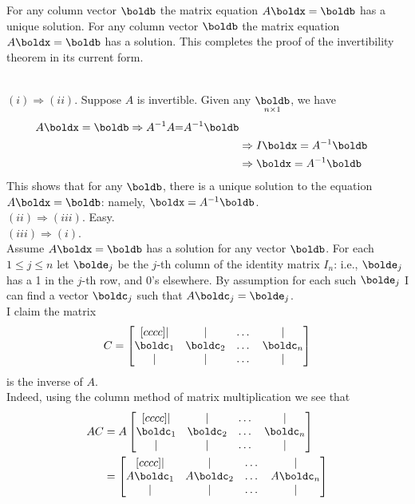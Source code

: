 \ii For any column vector $\boldb$ the matrix equation $A\boldx=\boldb$ has a unique solution.
\ii For any column vector $\boldb$ the matrix equation $A\boldx=\boldb$ has a solution.
\ee
This completes the proof of the invertibility theorem in its current form.
\\
\begin{solution}
\ \\
$(i)\Rightarrow (ii)$. Suppose $A$ is invertible. Given any $\underset{n\times 1}{\boldb}$, we have
\begin{align*}
A\boldx=\boldb\Rightarrow A^{-1}A\bold=A^{-1}\boldb\\
&\Rightarrow I\boldx=A^{-1}\boldb\\
&\Rightarrow \boldx=A^{-1}\boldb
\end{align*}
This shows that for any $\boldb$, there is a unique solution to the equation $A\boldx=\boldb$: namely, $\boldx=A^{-1}\boldb$.
\\
$(ii)\Rightarrow (iii)$. Easy.
\\
$(iii)\Rightarrow (i)$. \\
Assume $A\boldx=\boldb$ has a solution for any vector $\boldb$. For each $1\leq j\leq n$ let $\bolde_j$ be the $j$-th column of the identity matrix $I_n$: i.e., $\bolde_j$ has a 1 in the $j$-th row, and 0's elsewhere. By assumption for each such $\bolde_j$ I can find a vector $\boldc_j$ such that $A\boldc_j=\bolde_j$.
\\
I claim the matrix
\[
C=\begin{bmatrix}[cccc]\vert&\vert &\dots &\vert\\ \boldc_1&\boldc_2&\dots&\boldc_n\\\vert&\vert &\dots &\vert \end{bmatrix}\]
is the inverse of $A$.
\\
Indeed, using the column method of matrix multiplication we see that
\begin{align*}
AC&=A\begin{bmatrix}[cccc]\vert&\vert &\dots &\vert\\ \boldc_1&\boldc_2&\dots&\boldc_n\\\vert&\vert &\dots &\vert \end{bmatrix} \\
&=\begin{bmatrix}[cccc]\vert&\vert &\dots &\vert\\ A\boldc_1&A\boldc_2&\dots&A\boldc_n\\\vert&\vert &\dots &\vert \end{bmatrix}\\

\end{align*}
\end{solution}
